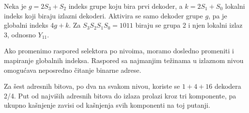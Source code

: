 Neka je \(g=2S_3+S_2\) indeks grupe koju bira prvi dekoder,
a \(k=2S_1+S_0\) lokalni indeks koji biraju izlazni dekoderi.
Aktivira se samo dekoder grupe \(g\), pa je globalni indeks \(4g+k\).
Za \(S_3S_2S_1S_0=1011\) biraju se grupa 2 i njen lokalni izlaz 3, odnosno \(Y_{11}\).

Ako promenimo raspored selektora po nivoima, moramo dosledno promeniti i mapiranje globalnih indeksa.
Raspored sa najmanjim težinama u izlaznom nivou omogućava neposredno čitanje binarne adrese.

Za šest adresnih bitova, po dva na svakom nivou, koriste se \(1+4+16\) dekodera 2/4.
Put od najviših adresnih bitova do izlaza prolazi kroz tri komponente,
pa ukupno kašnjenje zavisi od kašnjenja svih komponenti na toj putanji.
